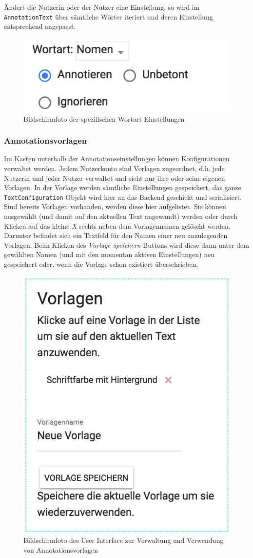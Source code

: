 Ändert die Nutzerin oder der Nutzer eine Einstellung, so wird im \texttt{AnnotationText} über sämtliche Wörter iteriert und deren Einstellung entsprechend angepasst.

\begin{figure}[h!]
	\centering
	\includegraphics[width=.4\linewidth, frame]{figures/frontend/config-pos}
	\caption{Bildschirmfoto der spezifischen Wortart Einstellungen}
	\label{fig:frontend-pos-einstellungen}
\end{figure}

\subsubsection{Annotationsvorlagen}

Im Kasten unterhalb der Annotationseinstellungen können Konfigurationen verwaltet werden. Jedem Nutzerkonto sind Vorlagen zugeordnet, d.h. jede Nutzerin und jeder Nutzer verwaltet und sieht nur ihre oder seine eigenen Vorlagen. In der Vorlage werden sämtliche Einstellungen gespeichert, das ganze \texttt{TextConfiguration} Objekt wird hier an das Backend geschickt und serialisiert.\\

Sind bereits Vorlagen vorhanden, werden diese hier aufgelistet. Sie können ausgewählt (und damit auf den aktuellen Text angewandt) werden oder durch Klicken auf das kleine \textit{X} rechts neben dem Vorlagennamen gelöscht werden. Darunter befindet sich ein Textfeld für den Namen einer neu anzulegenden Vorlagen. Beim Klicken des \textit{Vorlage speichern} Buttons wird diese dann unter dem gewählten Namen (und mit den momentan aktiven Einstellungen) neu gespeichert oder, wenn die Vorlage schon existiert überschrieben.

\begin{figure}[h!]
	\centering
	\includegraphics[width=.4\linewidth]{figures/frontend/config-vorlagen}
	\caption{Bildschirmfoto des User Interface zur Verwaltung und Verwendung von Annotationsvorlagen}
	\label{fig:frontend-vorlagen}
\end{figure}

